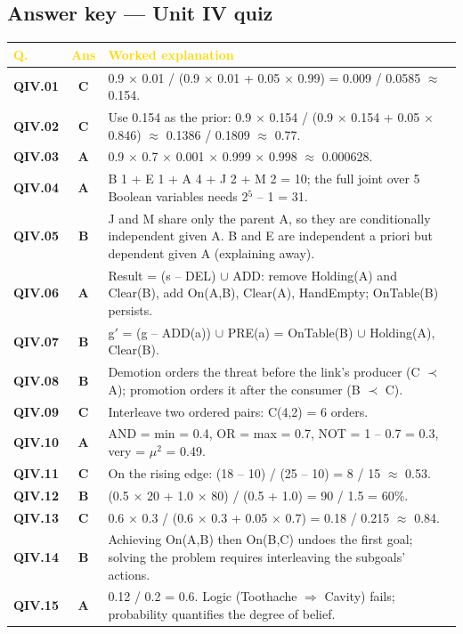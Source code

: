 \subsection*{Answer key --- Unit IV quiz}
\begin{longtable}{>{\leavevmode\bfseries\color{navy}}p{1.3cm} c p{13.2cm}}
\rowcolor{navy}\textcolor{gold}{\textbf{Q.}}&\textcolor{gold}{\textbf{Ans}}&\textcolor{gold}{\textbf{Worked explanation}}\\\endhead
QIV.01&\textbf{\color{leaf}C}&0.9 $\times$ 0.01 / (0.9 $\times$ 0.01 + 0.05 $\times$ 0.99) = 0.009 / 0.0585 $\approx$ 0.154.\\
\rowcolor{ivory}QIV.02&\textbf{\color{leaf}C}&Use 0.154 as the prior: 0.9 $\times$ 0.154 / (0.9 $\times$ 0.154 + 0.05 $\times$ 0.846) $\approx$ 0.1386 / 0.1809 $\approx$ 0.77.\\
QIV.03&\textbf{\color{leaf}A}&0.9 $\times$ 0.7 $\times$ 0.001 $\times$ 0.999 $\times$ 0.998 $\approx$ 0.000628.\\
\rowcolor{ivory}QIV.04&\textbf{\color{leaf}A}&B 1 + E 1 + A 4 + J 2 + M 2 = 10; the full joint over 5 Boolean variables needs 2$^5$ -- 1 = 31.\\
QIV.05&\textbf{\color{leaf}B}&J and M share only the parent A, so they are conditionally independent given A. B and E are independent a priori but dependent given A (explaining away).\\
\rowcolor{ivory}QIV.06&\textbf{\color{leaf}A}&Result = (s -- DEL) $\cup$ ADD: remove Holding(A) and Clear(B), add On(A,B), Clear(A), HandEmpty; OnTable(B) persists.\\
QIV.07&\textbf{\color{leaf}B}&g$'$ = (g -- ADD(a)) $\cup$ PRE(a) = {OnTable(B)} $\cup$ {Holding(A), Clear(B)}.\\
\rowcolor{ivory}QIV.08&\textbf{\color{leaf}B}&Demotion orders the threat before the link's producer (C $\prec$ A); promotion orders it after the consumer (B $\prec$ C).\\
QIV.09&\textbf{\color{leaf}C}&Interleave two ordered pairs: C(4,2) = 6 orders.\\
\rowcolor{ivory}QIV.10&\textbf{\color{leaf}A}&AND = min = 0.4, OR = max = 0.7, NOT = 1 -- 0.7 = 0.3, very = $\mu$$^2$ = 0.49.\\
QIV.11&\textbf{\color{leaf}C}&On the rising edge: (18 -- 10) / (25 -- 10) = 8 / 15 $\approx$ 0.53.\\
\rowcolor{ivory}QIV.12&\textbf{\color{leaf}B}&(0.5 $\times$ 20 + 1.0 $\times$ 80) / (0.5 + 1.0) = 90 / 1.5 = 60\%.\\
QIV.13&\textbf{\color{leaf}C}&0.6 $\times$ 0.3 / (0.6 $\times$ 0.3 + 0.05 $\times$ 0.7) = 0.18 / 0.215 $\approx$ 0.84.\\
\rowcolor{ivory}QIV.14&\textbf{\color{leaf}B}&Achieving On(A,B) then On(B,C) undoes the first goal; solving the problem requires interleaving the subgoals' actions.\\
QIV.15&\textbf{\color{leaf}A}&0.12 / 0.2 = 0.6. Logic (Toothache $\Rightarrow$ Cavity) fails; probability quantifies the degree of belief.\\
\end{longtable}